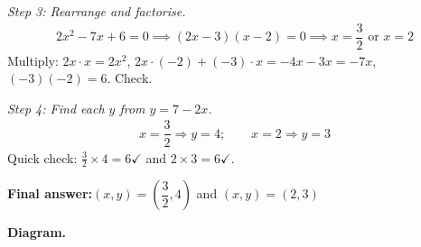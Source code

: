 \documentclass[11pt]{article}
\begin{document}
\textit{Step 3: Rearrange and factorise.}
\[\begin{gathered}
2x^2 - 7x + 6 = 0 \implies (2x - 3)(x - 2) = 0 \implies x = \dfrac{3}{2} \text{ or } x = 2
\end{gathered}\]
Multiply: \( 2x \cdot x = 2x^2 \), \( 2x \cdot (-2) + (-3) \cdot x = -4x - 3x = -7x \), \( (-3)(-2) = 6 \). Check.

\textit{Step 4: Find each \( y \) from \( y = 7 - 2x \).}
\[\begin{gathered}
x = \dfrac{3}{2} \Rightarrow y = 4; \qquad x = 2 \Rightarrow y = 3
\end{gathered}\]
Quick check: \( \tfrac{3}{2} \times 4 = 6 \checkmark \) and \( 2 \times 3 = 6 \checkmark \).

\begin{answerbox}
\textbf{Final answer:}\quad \(\displaystyle (x, y) = \left(\dfrac{3}{2}, 4\right)\) and \(\displaystyle (x, y) = (2, 3)\)
\end{answerbox}
\textbf{Diagram.}
\end{document}
